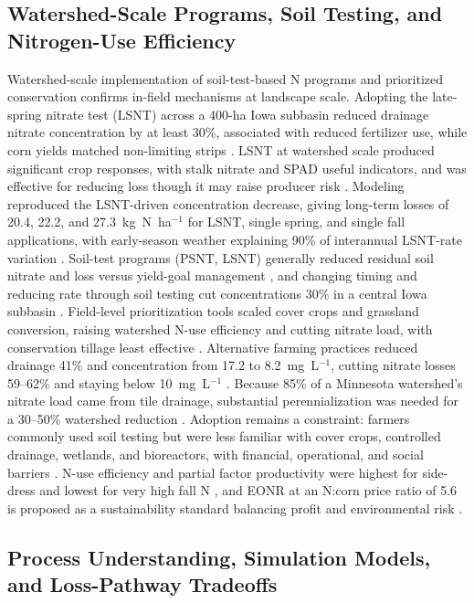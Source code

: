 \documentclass[11pt]{article}
\begin{document}
\subsection{Watershed-Scale Programs, Soil Testing, and Nitrogen-Use Efficiency}

Watershed-scale implementation of soil-test-based N programs and prioritized conservation confirms in-field mechanisms at landscape scale. Adopting the late-spring nitrate test (LSNT) across a 400-ha Iowa subbasin reduced drainage nitrate concentration by at least 30\%, associated with reduced fertilizer use, while corn yields matched non-limiting strips \parencite{Jaynes2004}. LSNT at watershed scale produced significant crop responses, with stalk nitrate and SPAD useful indicators, and was effective for reducing loss though it may raise producer risk \parencite{Karlen2005}. Modeling reproduced the LSNT-driven concentration decrease, giving long-term losses of 20.4, 22.2, and 27.3~kg~N~ha$^{-1}$ for LSNT, single spring, and single fall applications, with early-season weather explaining 90\% of interannual LSNT-rate variation \parencite{Malone2010}. Soil-test programs (PSNT, LSNT) generally reduced residual soil nitrate and loss versus yield-goal management \parencite{Dinnes2002}, and changing timing and reducing rate through soil testing cut concentrations 30\% in a central Iowa subbasin \parencite{Ritter2015}. Field-level prioritization tools scaled cover crops and grassland conversion, raising watershed N-use efficiency and cutting nitrate load, with conservation tillage least effective \parencite{Makhtoumi2025}. Alternative farming practices reduced drainage 41\% and concentration from 17.2 to 8.2~mg~L$^{-1}$, cutting nitrate losses 59--62\% and staying below 10~mg~L$^{-1}$ \parencite{Oquist2007}. Because 85\% of a Minnesota watershed's nitrate load came from tile drainage, substantial perennialization was needed for a 30--50\% watershed reduction \parencite{Wilson2023}. Adoption remains a constraint: farmers commonly used soil testing but were less familiar with cover crops, controlled drainage, wetlands, and bioreactors, with financial, operational, and social barriers \parencite{David2015}. N-use efficiency and partial factor productivity were highest for side-dress and lowest for very high fall N \parencite{Jaynes2015}, and EONR at an N:corn price ratio of 5.6 is proposed as a sustainability standard balancing profit and environmental risk \parencite{Bandura2025}.

\subsection{Process Understanding, Simulation Models, and Loss-Pathway Tradeoffs}
\end{document}
